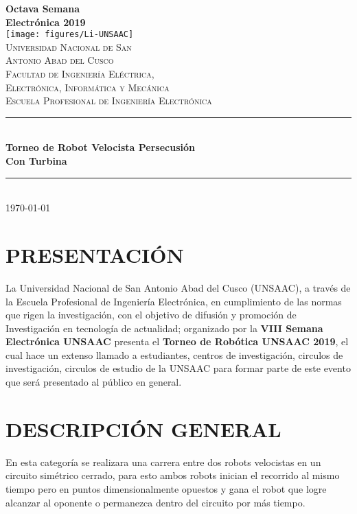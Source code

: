 \documentclass{article}
\newcommand\BackgroundPic{%
\put(0,0){%
\parbox[b][\paperheight]{\paperwidth}{%
\vfill
\centering
\texttt{[image: figures/back]}%
\vfill
}}}
\begin{document}
\AddToShipoutPicture*{\BackgroundPic}
\begin{titlepage}
\newcommand{\HRule}{\rule{\linewidth}{0.5mm}} 
\center
{\Huge \bfseries Octava Semana \\ Electrónica 2019} \\[1cm]
\texttt{[image: figures/Li-UNSAAC]}\\[1cm]
\textsc{\LARGE  Universidad Nacional de San \\[0.2cm] Antonio Abad del Cusco}\\[0.4cm] 
\textsc{\Large Facultad de Ingeniería Eléctrica, \\ Electrónica, Informática y Mecánica}\\[0.4cm] 
\textsc{\large Escuela Profesional de Ingeniería Electrónica}\\[0.4cm]
\HRule \\[0.4cm]
{ \huge \bfseries Torneo de Robot Velocista Persecusión \\
Con Turbina}\\[0.3cm] 
\HRule \\[1.5cm]
\today
\end{titlepage}



\newpage
\noindent
\normalfont

\section{PRESENTACIÓN}
\normalfont

La Universidad Nacional de San Antonio Abad del Cusco (UNSAAC), a través de la Escuela Profesional de Ingeniería Electrónica, en cumplimiento de las normas que rigen la investigación, con el objetivo de difusión y promoción de Investigación en tecnología de actualidad; organizado por la \textbf{VIII Semana Electrónica UNSAAC} presenta el \textbf{Torneo de Robótica UNSAAC 2019}, el cual hace un extenso llamado a estudiantes, centros de investigación, circulos de investigación, circulos de estudio de la UNSAAC para formar parte de este evento que será presentado al público en general.

\section{DESCRIPCIÓN GENERAL}

En esta categoría se realizara una carrera entre dos robots velocistas en un
circuito simétrico cerrado, para esto ambos robots inician el recorrido al mismo
tiempo pero en puntos dimensionalmente opuestos y gana el robot que logre
alcanzar al oponente o permanezca dentro del circuito por más tiempo.
\end{document}

